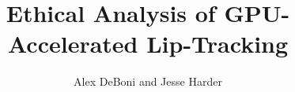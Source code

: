 \documentclass{article}
\begin{document}
\title{Ethical Analysis of GPU-Accelerated Lip-Tracking}
\author{Alex DeBoni and Jesse Harder}
\date{}
\maketitle

\newif\ifethics
\ethicstrue




\end{document}
